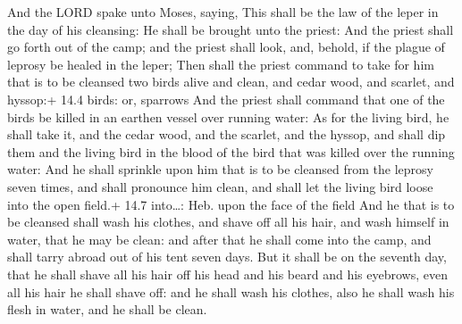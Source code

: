  And the LORD spake unto Moses, saying,  This
shall be the law of the leper in the day of his cleansing: He shall be
brought unto the priest:  And the priest shall go forth out
of the camp; and the priest shall look, and, behold, if the plague of
leprosy be healed in the leper;  Then shall the priest
command to take for him that is to be cleansed two birds alive and
clean, and cedar wood, and scarlet, and hyssop:+ 14.4 birds: or,
sparrows  And the priest shall command that one of the birds
be killed in an earthen vessel over running water:  As for
the living bird, he shall take it, and the cedar wood, and the scarlet,
and the hyssop, and shall dip them and the living bird in the blood of
the bird that was killed over the running water:  And he
shall sprinkle upon him that is to be cleansed from the leprosy seven
times, and shall pronounce him clean, and shall let the living bird
loose into the open field.+ 14.7 into\ldots: Heb. upon the face of the
field  And he that is to be cleansed shall wash his clothes,
and shave off all his hair, and wash himself in water, that he may be
clean: and after that he shall come into the camp, and shall tarry
abroad out of his tent seven days.  But it shall be on the
seventh day, that he shall shave all his hair off his head and his beard
and his eyebrows, even all his hair he shall shave off: and he shall
wash his clothes, also he shall wash his flesh in water, and he shall be
clean.

